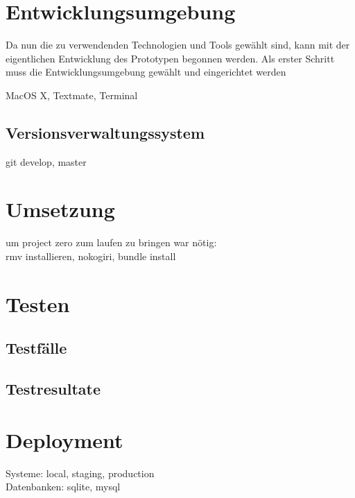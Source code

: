 \section{Entwicklungsumgebung}
Da nun die zu verwendenden Technologien und Tools gewählt sind, kann mit der
eigentlichen Entwicklung des Prototypen begonnen werden. Als erster Schritt
muss die Entwicklungsumgebung gewählt und eingerichtet werden

MacOS X, Textmate, Terminal

\subsection{Versionsverwaltungssystem}
git develop, master

\section{Umsetzung}

um project zero zum laufen zu bringen war nötig:\\
rmv installieren, nokogiri, bundle install

\section{Testen}

\subsection{Testfälle}

\subsection{Testresultate}

\section{Deployment}
Systeme: local, staging, production\\
Datenbanken: sqlite, mysql